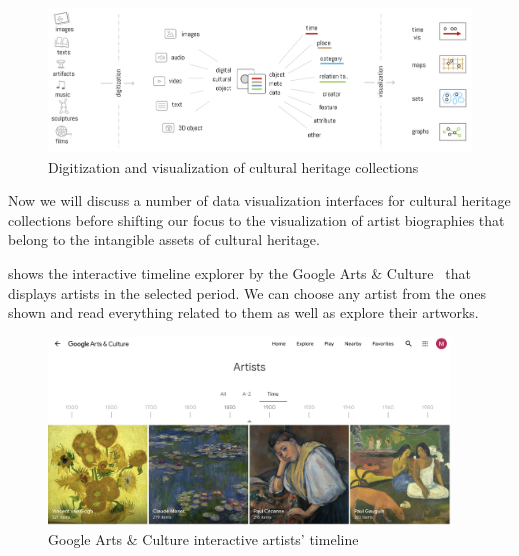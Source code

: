 \begin{figure}[hbt!]
    \begin{center}
        \includegraphics[width=\textwidth]{graphics/2-literature-review/18}
    \end{center}
    \caption{Digitization and visualization of cultural heritage collections~\citep{windhager2020many}}
    \label{fig:figure2.18}
\end{figure}

Now we will discuss a number of data visualization interfaces for cultural heritage collections before shifting our focus to the
visualization of artist biographies that belong to the intangible assets of cultural heritage.

 shows the interactive timeline explorer by the Google Arts \& Culture~\citep{google} that displays artists in the
selected period. We can choose any artist from the ones shown and read everything related to them as well as explore their artworks.

\clearpage

\begin{figure}[hbt!]
    \begin{center}
        \includegraphics[width=0.95\textwidth]{graphics/2-literature-review/19}
    \end{center}
    \caption{Google Arts \& Culture interactive artists' timeline}
    \label{fig:figure2.19}
\end{figure}

